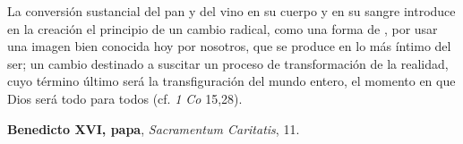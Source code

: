 \begin{liturgiabox}{}
\begin{liturgiatext}
		La conversión sustancial del pan y del vino en su cuerpo y en su sangre introduce en la creación el principio de un cambio radical, como una forma de , por usar una imagen bien conocida hoy por nosotros, que se produce en lo más íntimo del ser; un cambio destinado a suscitar un proceso de transformación de la realidad, cuyo término último será la transfiguración del mundo entero, el momento en que Dios será todo para todos (cf. \emph{1 Co} 15,28).
		
		
		\textbf{Benedicto XVI, papa}, \emph{Sacramentum Caritatis}, 11.
	\end{liturgiatext}
	
\end{liturgiabox}	





\newpage

